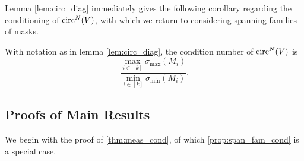 Lemma \ref{lem:circ_diag} immediately gives the following corollary regarding the conditioning of $\operatorname{circ}^N(V)$, with which we return to considering spanning families of masks.

\begin{corollary}
  With notation as in lemma \ref{lem:circ_diag}, the condition number of $\operatorname{circ}^N(V)$ is \[\dfrac{\max\limits_{i \in [k]} \sigma_{\max} (M_i)}{\min\limits_{i \in [k]} \sigma_{\min} (M_i)}.\] \label{cor:circ_diag_condition}
\end{corollary}

\subsection{Proofs of Main Results}
\label{sec:gam_fam}
We begin with the proof of \cref{thm:meas_cond}, of which \cref{prop:span_fam_cond} is a special case.

